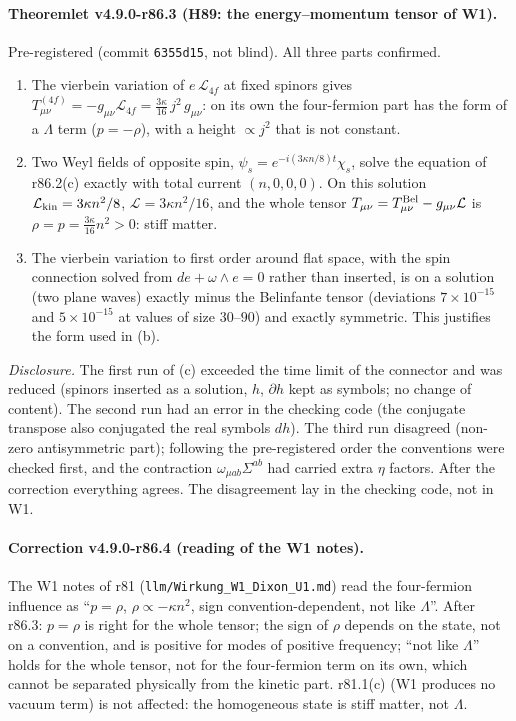 \paragraph{Theoremlet v4.9.0-r86.3 (H89: the energy--momentum tensor of W1).}
Pre-registered (commit \texttt{6355d15}, not blind).  All three parts confirmed.
\begin{enumerate}[leftmargin=2em]
\item[(a)] The vierbein variation of \(e\,\mathcal L_{4f}\) at fixed spinors gives \(T^{(4f)}_{\mu\nu}=-g_{\mu\nu}\mathcal L_{4f}=\tfrac{3\kappa}{16}\,j^2\,g_{\mu\nu}\): on
its own the four-fermion part has the form of a \(\Lambda\) term (\(p=-\rho\)), with a height \(\propto j^2\) that is not constant.
\item[(b)] Two Weyl fields of opposite spin, \(\psi_s=e^{-i(3\kappa n/8)t}\chi_s\), solve the equation of r86.2(c) exactly with total current
\((n,0,0,0)\).  On this solution \(\mathcal L_{\rm kin}=3\kappa n^2/8\), \(\mathcal L=3\kappa n^2/16\), and the whole tensor
\(T_{\mu\nu}=T^{\rm Bel}_{\mu\nu}-g_{\mu\nu}\mathcal L\) is \(\rho=p=\tfrac{3\kappa}{16}n^2>0\): stiff matter.
\item[(c)] The vierbein variation to first order around flat space, with the spin connection solved from \(de+\omega\wedge e=0\) rather than
inserted, is on a solution (two plane waves) exactly minus the Belinfante tensor (deviations \(7\times10^{-15}\) and \(5\times10^{-15}\) at values of size
\(30\)--\(90\)) and exactly symmetric.  This justifies the form used in (b).
\end{enumerate}
\emph{Disclosure.}  The first run of (c) exceeded the time limit of the connector and was reduced (spinors inserted as a solution, \(h\),
\(\partial h\) kept as symbols; no change of content).  The second run had an error in the checking code (the conjugate transpose also
conjugated the real symbols \(dh\)).  The third run disagreed (non-zero antisymmetric part); following the pre-registered order the
conventions were checked first, and the contraction \(\omega_{\mu ab}\Sigma^{ab}\) had carried extra \(\eta\) factors.  After the correction everything
agrees.  The disagreement lay in the checking code, not in W1.

\paragraph{Correction v4.9.0-r86.4 (reading of the W1 notes).}
The W1 notes of r81 (\texttt{llm/\allowbreak Wirkung\_W1\_Dixon\_U1.md}) read the four-fermion influence as ``\(p=\rho\), \(\rho\propto-\kappa n^2\), sign
convention-dependent, not like \(\Lambda\)''.  After r86.3: \(p=\rho\) is right for the whole tensor; the sign of \(\rho\) depends on the state, not on a
convention, and is positive for modes of positive frequency; ``not like \(\Lambda\)'' holds for the whole tensor, not for the four-fermion term on
its own, which cannot be separated physically from the kinetic part.  r81.1(c) (W1 produces no vacuum term) is not affected: the homogeneous
state is stiff matter, not \(\Lambda\).

